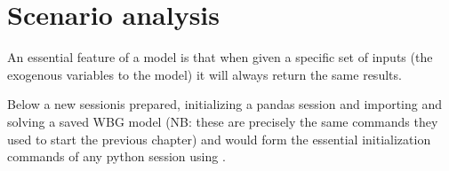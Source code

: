 \documentclass[letterpaper,10pt,english]{jupyterBook}
\begin{document}
\sphinxstepscope


\chapter{Scenario analysis}
\label{\detokenize{content/06_WBModels/ScenarioAnalysis:scenario-analysis}}\label{\detokenize{content/06_WBModels/ScenarioAnalysis::doc}}
\sphinxAtStartPar
An essential feature of a model is that when given a specific set of inputs (the exogenous variables to the model) it will always return the same results.

\sphinxAtStartPar
Below a new  sessionis prepared, initializing a pandas session and importing and solving a saved WBG model (NB: these are precisely the same commands they used to start the previous chapter) and would form the essential initialization commands of any python session using .
\end{document}
